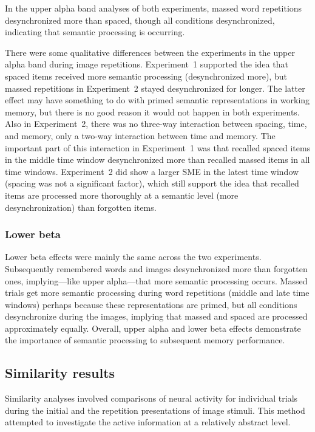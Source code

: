 In the upper alpha band analyses of both experiments, massed word repetitions desynchronized more than spaced, though all conditions desynchronized, indicating that semantic processing is occurring.

There were some qualitative differences between the experiments in the upper alpha band during image repetitions.  Experiment~1 supported the idea that spaced items received more semantic processing (desynchronized more), but massed repetitions in Experiment~2 stayed desynchronized for longer.  The latter effect may have something to do with primed semantic representations in working memory, but there is no good reason it would not happen in both experiments.  Also in Experiment~2, there was no three-way interaction between spacing, time, and memory, only a two-way interaction between time and memory.  The important part of this interaction in Experiment~1 was that recalled spaced items in the middle time window desynchronized more than recalled massed items in all time windows.  Experiment~2 did show a larger SME in the latest time window (spacing was not a significant factor), which still support the idea that recalled items are processed more thoroughly at a semantic level (more desynchronization) than forgotten items.



\subsubsection{Lower beta}

Lower beta effects were mainly the same across the two experiments.  Subsequently remembered words and images desynchronized more than forgotten ones, implying---like upper alpha---that more semantic processing occurs.
Massed trials get more semantic processing during word repetitions (middle and late time windows) perhaps because these representations are primed, but all conditions desynchronize during the images, implying that massed and spaced are processed approximately equally.  Overall, upper alpha and lower beta effects demonstrate the importance of semantic processing to subsequent memory performance.

\subsection{Similarity results}

Similarity analyses involved comparisons of neural activity for individual trials during the initial and the repetition presentations of image stimuli.  This method attempted to investigate the active information at a relatively abstract level.

